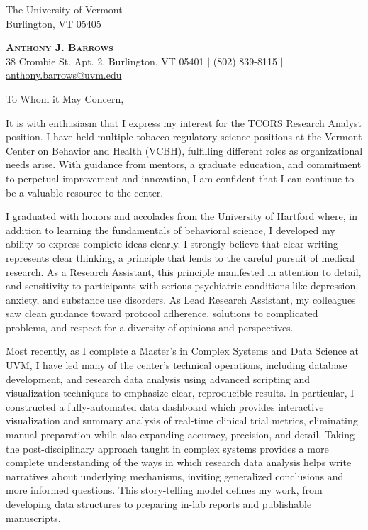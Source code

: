 \documentclass[]{letter}
\begin{document}
\begin{letter}{The University of Vermont \\ Burlington, VT 05405}
	
	\begin{center}
		\textbf{\Huge \scshape Anthony J. Barrows} \\ \vspace{3pt}
		\small 38 Crombie St. Apt. 2, Burlington, VT 05401 $|$
		\small (802) 839-8115 $|$
		\href{mailto:ajbarrow@uvm.edu}{anthony.barrows@uvm.edu}
	\end{center}
\opening{To Whom it May Concern,}
It is with enthusiasm that I express my interest for the TCORS Research Analyst position. I have held multiple tobacco regulatory science positions at the Vermont Center on Behavior and Health (VCBH), fulfilling different roles as organizational needs arise. With guidance from mentors, a graduate education, and commitment to perpetual improvement and innovation, I am confident that I can continue to be a valuable resource to the center.

I graduated with honors and accolades from the University of Hartford where, in addition to learning the fundamentals of behavioral science, I developed my ability to express complete ideas clearly. I strongly believe that clear writing represents clear thinking, a principle that lends to the careful pursuit of medical research. As a Research Assistant, this principle manifested in attention to detail, and sensitivity to participants with serious psychiatric conditions like depression, anxiety, and substance use disorders. As Lead Research Assistant, my colleagues saw clean guidance toward protocol adherence, solutions to complicated problems, and respect for a diversity of opinions and perspectives.

Most recently, as I complete a Master's in Complex Systems and Data Science at UVM, I have led many of the center's technical operations, including database development, and research data analysis using advanced scripting and visualization techniques to emphasize clear, reproducible results. In particular, I constructed a fully-automated data dashboard which provides interactive visualization and summary analysis of real-time clinical trial metrics, eliminating manual preparation while also expanding accuracy, precision, and detail. Taking the post-disciplinary approach taught in complex systems provides a more complete understanding of the ways in which research data analysis helps write narratives about underlying mechanisms, inviting generalized conclusions and more informed questions. This story-telling model defines my work, from developing data structures to preparing in-lab reports and publishable manuscripts.


\end{letter}
\end{document}
